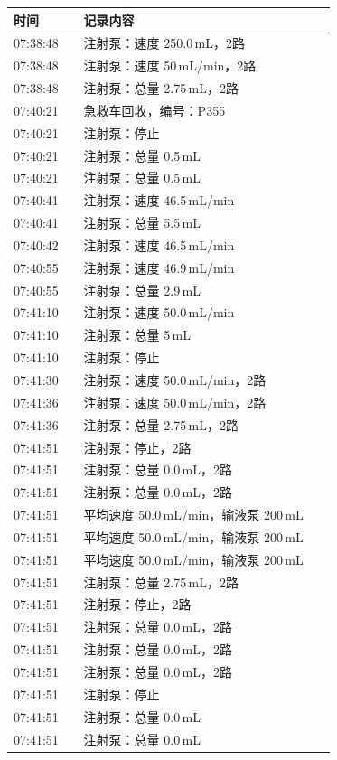 \documentclass[UTF8,10pt,a4paper,fontset=fandol]{ctexart}
\begin{document}
\noindent
\begin{tabular}{p{0.20\linewidth}p{0.72\linewidth}}
\textbf{时间} & \textbf{记录内容}\\ \hline
07:38:48 & 注射泵：速度 250.0\,mL，2路\\
07:38:48 & 注射泵：速度 50\,mL/min，2路\\
07:38:48 & 注射泵：总量 2.75\,mL，2路\\
07:40:21 & 急救车回收，编号：P355\\
07:40:21 & 注射泵：停止\\
07:40:21 & 注射泵：总量 0.5\,mL\\
07:40:21 & 注射泵：总量 0.5\,mL\\
07:40:41 & 注射泵：速度 46.5\,mL/min\\
07:40:41 & 注射泵：总量 5.5\,mL\\
07:40:42 & 注射泵：速度 46.5\,mL/min\\
07:40:55 & 注射泵：速度 46.9\,mL/min\\
07:40:55 & 注射泵：总量 2.9\,mL\\
07:41:10 & 注射泵：速度 50.0\,mL/min\\
07:41:10 & 注射泵：总量 5\,mL\\
07:41:10 & 注射泵：停止\\
07:41:30 & 注射泵：速度 50.0\,mL/min，2路\\
07:41:36 & 注射泵：速度 50.0\,mL/min，2路\\
07:41:36 & 注射泵：总量 2.75\,mL，2路\\
07:41:51 & 注射泵：停止，2路\\
07:41:51 & 注射泵：总量 0.0\,mL，2路\\
07:41:51 & 注射泵：总量 0.0\,mL，2路\\
07:41:51 & 平均速度 50.0\,mL/min，输液泵 200\,mL\\
07:41:51 & 平均速度 50.0\,mL/min，输液泵 200\,mL\\
07:41:51 & 平均速度 50.0\,mL/min，输液泵 200\,mL\\
07:41:51 & 注射泵：总量 2.75\,mL，2路\\
07:41:51 & 注射泵：停止，2路\\
07:41:51 & 注射泵：总量 0.0\,mL，2路\\
07:41:51 & 注射泵：总量 0.0\,mL，2路\\
07:41:51 & 注射泵：总量 0.0\,mL，2路\\
07:41:51 & 注射泵：停止\\
07:41:51 & 注射泵：总量 0.0\,mL\\
07:41:51 & 注射泵：总量 0.0\,mL\\
\end{tabular}
\end{document}
